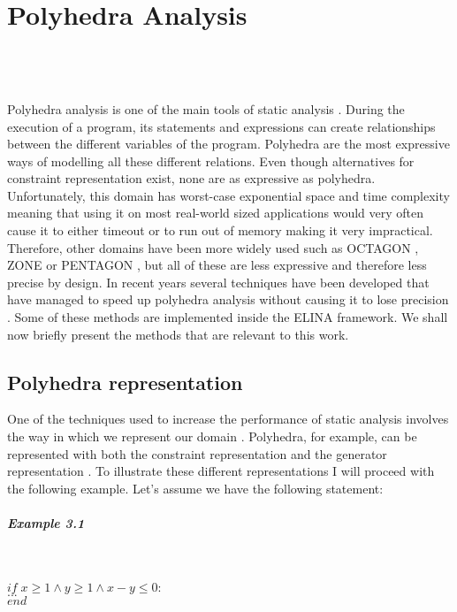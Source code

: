 
\chapter{Polyhedra Analysis}
\mbox{}\\
\mbox{}\\
\mbox{}\\
Polyhedra analysis is one of the main tools of static analysis \cite{cousot1977abstract}. During the execution of a program, its statements and expressions can create relationships between the different variables of the program. Polyhedra are the most expressive ways of modelling all these different relations. Even though alternatives for constraint representation exist, none are as expressive as polyhedra. Unfortunately, this domain has worst-case exponential space and time complexity meaning that using it on most real-world sized applications would very often cause it to either timeout or to run out of memory making it very impractical. Therefore, other domains have been more widely used such as OCTAGON \cite{mine2006octagon}, ZONE \cite{mine2001new} or PENTAGON \cite{logozzo2010pentagons}, but all of these are less expressive and therefore less precise by design. In recent years several techniques have been developed that have managed to speed up polyhedra analysis without causing it to lose precision \cite{gange2016exploiting,jourdan2017sparsity,marechal2017efficient}. Some of these methods are implemented inside the ELINA framework. We shall now briefly present the methods that are relevant to this work.
\section{Polyhedra representation}
One of the techniques used to increase the performance of static analysis involves the way in which we represent our domain \cite{singh2015making}. Polyhedra, for example, can be represented with both the constraint representation and the generator representation \cite{motzkin1953double}. To illustrate these different representations I will proceed with the following example. Let's assume we have the following statement:
\paragraph{Example 3.1}\mbox{}\\
\begin{center}
	$if \; x\geq1\wedge y \geq 1 \wedge x - y \leq 0: $\\ 
	$...\;\;\;\;\;$\\
	$end \qquad\qquad\qquad\qquad\qquad$
\end{center}

